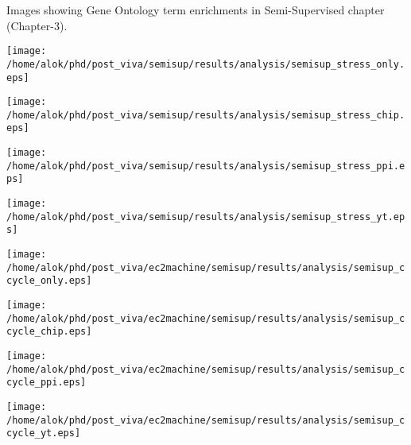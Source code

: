 Images showing Gene Ontology term enrichments in Semi-Supervised chapter (Chapter-3).

\begin{center}
 \texttt{[image: /home/alok/phd/post\_viva/semisup/results/analysis/semisup\_stress\_only.eps]}
\end{center}

\begin{center}
 \texttt{[image: /home/alok/phd/post\_viva/semisup/results/analysis/semisup\_stress\_chip.eps]}
\end{center}

\begin{center}
 \texttt{[image: /home/alok/phd/post\_viva/semisup/results/analysis/semisup\_stress\_ppi.eps]}
\end{center}

\begin{center}
 \texttt{[image: /home/alok/phd/post\_viva/semisup/results/analysis/semisup\_stress\_yt.eps]}
\end{center}

\begin{center}
 \texttt{[image: /home/alok/phd/post\_viva/ec2machine/semisup/results/analysis/semisup\_ccycle\_only.eps]}
\end{center}

\begin{center}
 \texttt{[image: /home/alok/phd/post\_viva/ec2machine/semisup/results/analysis/semisup\_ccycle\_chip.eps]}
\end{center}
\begin{center}
 \texttt{[image: /home/alok/phd/post\_viva/ec2machine/semisup/results/analysis/semisup\_ccycle\_ppi.eps]}
\end{center}
\begin{center}
 \texttt{[image: /home/alok/phd/post\_viva/ec2machine/semisup/results/analysis/semisup\_ccycle\_yt.eps]}
\end{center}


